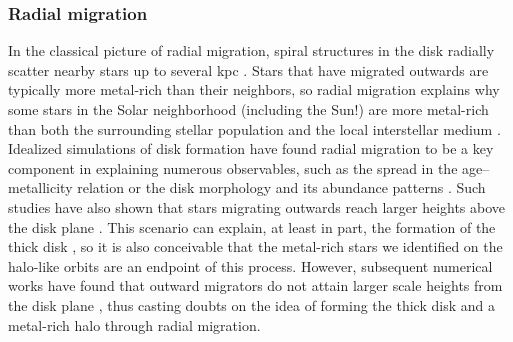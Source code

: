 \documentclass[apj, twocolappendix, numberedappendix, appendixfloats]{emulateapj}
\begin{document}
\subsubsection{Radial migration}
\label{sec:migration}
In the classical picture of radial migration, spiral structures in the disk radially scatter nearby stars up to several kpc \citep{sellwood2002}.
Stars that have migrated outwards are typically more metal-rich than their neighbors, so radial migration explains why some stars in the Solar neighborhood (including the Sun!) are more metal-rich than both the surrounding stellar population and the local interstellar medium \citep{wielen1996}.
Idealized simulations of disk formation have found radial migration to be a key component in explaining numerous observables, such as the spread in the age--metallicity relation \citep{roskar2008} or the disk morphology and its abundance patterns \citep{schonrich2009}.
Such studies have also shown that stars migrating outwards reach larger heights above the disk plane \citep[e.g.,][]{schonrich2009, loebman2011}.
This scenario can explain, at least in part, the formation of the thick disk \citep[e.g.,][]{wilson2011}, so it is also conceivable that the metal-rich stars we identified on the halo-like orbits are an endpoint of this process.
However, subsequent numerical works have found that outward migrators do not attain larger scale heights from the disk plane \citep{minchev2012, vera-ciro2014}, thus casting doubts on the idea of forming the thick disk and a metal-rich halo through radial migration.
\end{document}
